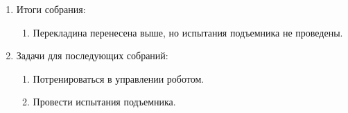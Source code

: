 \begin{enumerate}
\begin{enumerate}
	\end{enumerate}
	
	\item Итоги собрания:
	\begin{enumerate}
		
		\item Перекладина перенесена выше, но испытания подъемника не проведены.
		
	\end{enumerate}
	
	\item Задачи для последующих собраний:
	\begin{enumerate}
		
		\item Потренироваться в управлении роботом.
		
		\item Провести испытания подъемника.
			
	\end{enumerate}
\end{enumerate}
\fillpage
